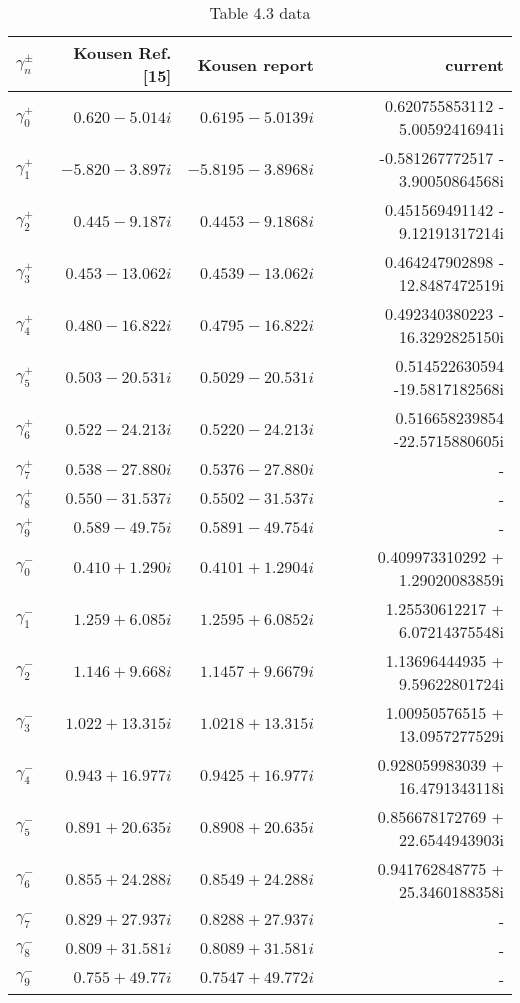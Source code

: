\begin{table}
 \centering
 \begin{adjustbox}{width=1\textwidth}
     \small
\begin{tabular}{c | r | r | r }
 \hline
 $\gamma^{\pm}_n$ & Kousen Ref. [15] & Kousen report &   current  \\
 \hline
 $\gamma_0^{+}$ & $ 0.620 - 5.014  i $ & $ 0.6195 - 5.0139 i$ & 0.620755853112 - 5.00592416941i  \\
 $\gamma_1^{+}$ & $-5.820 - 3.897  i $ & $-5.8195 - 3.8968 i$ &-0.581267772517 - 3.90050864568i \\
 $\gamma_2^{+}$ & $ 0.445 - 9.187  i $ & $ 0.4453 - 9.1868 i$ &0.451569491142 -  9.12191317214i\\
 $\gamma_3^{+}$ & $ 0.453 - 13.062 i $ & $ 0.4539 - 13.062 i$ &0.464247902898 - 12.8487472519i \\ 
 $\gamma_4^{+}$ & $ 0.480 - 16.822 i $ & $ 0.4795 - 16.822 i$ &0.492340380223 - 16.3292825150i \\
 $\gamma_5^{+}$ & $ 0.503 - 20.531 i $ & $ 0.5029 - 20.531 i$ &0.514522630594 -19.5817182568i \\
 $\gamma_6^{+}$ & $ 0.522 - 24.213 i $ & $ 0.5220 - 24.213 i$ &0.516658239854 -22.5715880605i \\
 $\gamma_7^{+}$ & $ 0.538 - 27.880 i $ & $ 0.5376 - 27.880 i$ & -  \\
 $\gamma_8^{+}$ & $ 0.550 - 31.537 i $ & $ 0.5502 - 31.537 i$ & -  \\
 $\gamma_9^{+}$ & $ 0.589 - 49.75  i $ & $ 0.5891 - 49.754 i$ &-  \\ \hline
 $\gamma_0^{-}$ & $ 0.410 + 1.290  i $ & $ 0.4101 + 1.2904 i$ &0.409973310292  + 1.29020083859i\\
 $\gamma_1^{-}$ & $ 1.259 + 6.085  i $ & $ 1.2595 + 6.0852 i$ &1.25530612217  + 6.07214375548i \\
 $\gamma_2^{-}$ & $ 1.146 + 9.668  i $ & $ 1.1457 + 9.6679 i$ &1.13696444935  + 9.59622801724i \\
 $\gamma_3^{-}$ & $ 1.022 + 13.315 i $ & $ 1.0218 + 13.315 i$  &1.00950576515 + 13.0957277529i \\
 $\gamma_4^{-}$ & $ 0.943 + 16.977 i $ & $ 0.9425 + 16.977 i$  &0.928059983039 +  16.4791343118i\\
 $\gamma_5^{-}$ & $ 0.891 + 20.635 i $ & $ 0.8908 + 20.635 i$    &0.856678172769 +  22.6544943903i \\
 $\gamma_6^{-}$ & $ 0.855 + 24.288 i $ & $ 0.8549 + 24.288 i$    &0.941762848775 +  25.3460188358i \\
 $\gamma_7^{-}$ & $ 0.829 + 27.937 i $ & $ 0.8288 + 27.937 i$    &-  \\
 $\gamma_8^{-}$ & $ 0.809 + 31.581 i $ & $ 0.8089 + 31.581 i$    &-  \\
 $\gamma_9^{-}$ & $ 0.755 + 49.77  i $ & $ 0.7547 + 49.772 i$    &-  \\ \hline
 \end{tabular}
\end{adjustbox}
 \caption{Table 4.3 data}
 \label{Table43}
\end{table}

